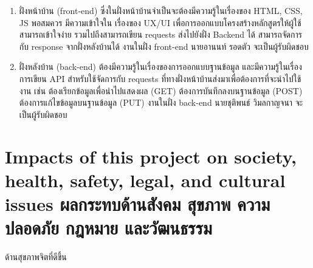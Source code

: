 \begin{enumerate}
    
    \item ฝั่งหน้าบ้าน (front-end)  ซึ่งในฝั่งหน้าบ้านจําเป็นจะต้องมีความรู้ในเรื่องของ HTML, CSS, JS พอสมควร มีความเข้าใจใน เรื่องของ UX/UI เพื่อการออกแบบโครงสร้างหลักสูตรให้ผู้ใช้สามารถเข้าใจง่าย รวมไปถึงสามารถเขียน requests ส่งไปยังฝั่ง Backend ได้ สามารถจัดการกับ response จากฝั่งหลังบ้านได้ งานในฝั่ง front-end นายอานนท์ รอดตัว จะเป็นผู้รับผิดชอบ
    \item ฝั่งหลังบ้าน (back-end) ต้องมีความรู้ในเรื่องของการออกแบบฐานข้อมูล และมีความรู้ในเรื่องการเขียน API สําหรับใช้จัดการกับ requests ที่ทางฝั่งหน้าบ้านส่งมาเพื่อต้องการที่จะนําไปใช้งาน เช่น ต้องเรียกข้อมูลเพื่อนำไปแสดงผล (GET) ต้องการบันทึกลงบนฐานข้อมูล (POST) ต้องการแก้ไขข้อมูลบนฐานข้อมูล (PUT) งานในฝั่ง back-end นายชุติพนธ์ วิมลกาญจนา จะเป็นผู้รับผิดชอบ

\end{enumerate}


\section{\ifenglish%
Impacts of this project on society, health, safety, legal, and cultural issues
\else%
ผลกระทบด้านสังคม สุขภาพ ความปลอดภัย กฎหมาย และวัฒนธรรม\fi}


ด้านสุขภาพจิตที่ดีขึ้น 

